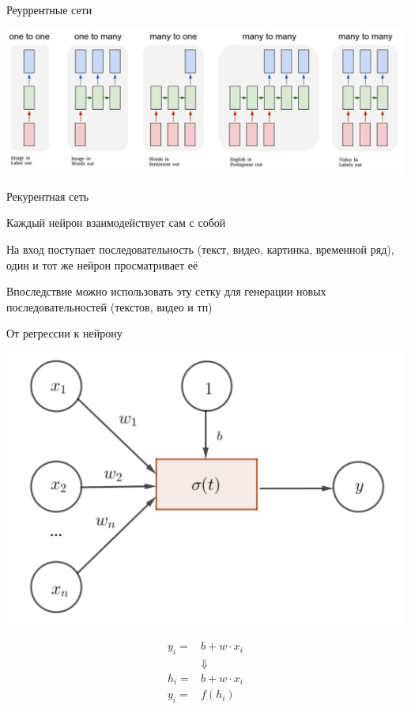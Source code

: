 \documentclass[notes,12pt, aspectratio=169]{beamer}
\newenvironment{wideitemize}{\itemize\addtolength{\itemsep}{10pt}}{\enditemize}
\begin{document}
\begin{frame}{Реуррентные сети}
\begin{center}
	\includegraphics[width=.95\linewidth]{rnn_variants.png}
\end{center}
\end{frame}

\begin{frame}{Рекурентная сеть}
\begin{wideitemize} 
	\item  Каждый нейрон взаимодействует сам с собой 
	\item  На вход поступает последовательность (текст, видео, картинка, временной ряд), один и тот же нейрон просматривает её
	\item Впоследствие можно использовать эту сетку для генерации новых последовательностей (текстов, видео и тп)
\end{wideitemize} 
\end{frame}

\begin{frame}{От регрессии к нейрону}
\begin{center}
	\includegraphics[width=.4\linewidth]{neuron_3.png}
\end{center}
\begin{equation*} 
	\begin{aligned}
		y_i =& b + w \cdot x_i \\
		&\Downarrow \\
		h_i =& b + w \cdot x_i \\
		y_i = & f(h_i)
	\end{aligned}
\end{equation*} 
\end{frame}
\end{document}
